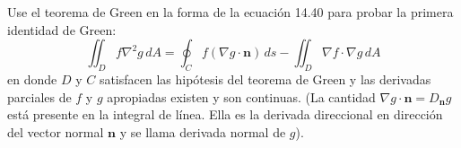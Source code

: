 \item Use el teorema de Green en la forma de la ecuación 14.40 para probar la primera identidad de Green:
    \[ \iint_D f \nabla^2 g \, dA = \oint_C f (\nabla g \cdot \mathbf{n}) \, ds - \iint_D \nabla f \cdot \nabla g \, dA \]
    en donde $D$ y $C$ satisfacen las hipótesis del teorema de Green y las derivadas parciales de $f$ y $g$ apropiadas existen y son continuas. (La cantidad $\nabla g \cdot \mathbf{n} = D_{\mathbf{n}} g$ está presente en la integral de línea. Ella es la derivada direccional en dirección del vector normal $\mathbf{n}$ y se llama derivada normal de $g$).
